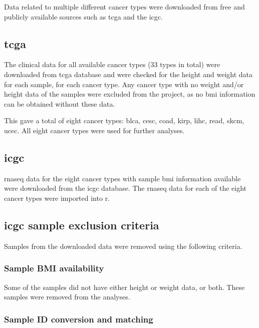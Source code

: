 Data related to multiple different cancer types were downloaded from free and publicly available sources such as \gls{tcga} and the \gls{icgc}.

\subsection{\gls{tcga}}
\label{subsec:tcga}

The clinical data for all available cancer types (33 types in total) were downloaded from \gls{tcga} database and were checked for the height and weight data for each sample, for each cancer type.
Any cancer type with no weight and/or height data of the samples were excluded from the project, as no \gls{bmi} information can be obtained without these data.

This gave a total of eight cancer types: \gls{blca}, \gls{cesc}, \gls{coad}, \gls{kirp}, \gls{lihc}, \gls{read}, \gls{skcm}, \gls{ucec}.
All eight cancer types were used for further analyses.

\subsection{\gls{icgc}}
\label{subsec:icgc}

\gls{rnaseq} data for the eight cancer types with sample \gls{bmi} information available were downloaded from the \gls{icgc} database.
The \gls{rnaseq} data for each of the eight cancer types were imported into \gls{r}.

\subsection{\gls{icgc} sample exclusion criteria}
\label{subsec:sampleexclusion}

Samples from the downloaded data were removed using the following criteria.

\subsubsection{\textbf{Sample BMI availability}}
\label{subsubsec:samplebmiavailability}

Some of the samples did not have either height or weight data, or both.
These samples were removed from the analyses.

\subsubsection{\textbf{Sample ID conversion and matching}}
\label{subsubsec:sampleidconversion}


